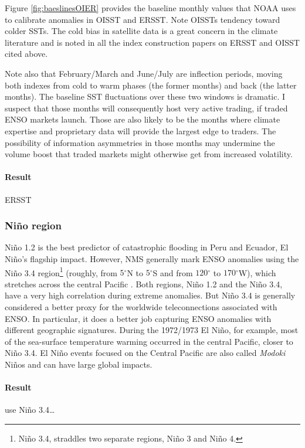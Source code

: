 \documentclass[authoryear]{article}
\newcommand{\degreesym}{\ensuremath{^\circ}}
\begin{document}
Figure \ref{fig:baeslinesOIER} provides the baseline monthly values that NOAA uses to calibrate anomalies in OISST and ERSST. Note OISSTs tendency toward colder SSTs. The cold bias in satellite data is a great concern in the climate literature and is noted in all the index construction papers on ERSST and OISST cited above.

Note also that February/March and June/July are inflection periods, moving both indexes from cold to warm phases (the former months) and back (the latter months). The baseline SST fluctuations over these two windows is dramatic. I suspect that those months will consequently host very active trading, if traded ENSO markets launch. Those are also likely to be the months where climate expertise and proprietary data will provide the largest edge to traders. The possibility of information asymmetries in those months may undermine the volume boost that traded markets might otherwise get from increased volatility. 

\paragraph{Result}
ERSST

\subsubsection{Ni\~no region}
Ni\~no 1.2 is the best predictor of catastrophic flooding in Peru and Ecuador, El Ni\~no's flagship impact. However, NMS generally mark ENSO anomalies using the Ni\~no 3.4 region\footnote{Ni\~no 3.4, straddles two separate regions, Ni\~no 3 and Ni\~no 4.} (roughly, from $5\degreesym$N to $5\degreesym$S and from $120\degreesym$ to $170\degreesym$W), which stretches across the central Pacific\cite{khalil2007Nino} \cite{barnston1997documentation}. Both regions, Ni\~no 1.2 and the Ni\~no 3.4, have a very high correlation during extreme anomalies. But Ni\~no 3.4 is generally considered a better proxy for the worldwide teleconnections associated with ENSO. In particular,  it does a better job capturing ENSO anomalies with different geographic signatures. During the 1972/1973 El Ni\~no, for example, most of the sea-surface temperature warming occurred in the central Pacific, closer to Ni\~no 3.4. El Ni\~no events focused on the Central Pacific are also called \emph{Modoki} Ni\~nos and can have large global impacts\cite{ashok2007Nino}.

\paragraph{Result}
use Ni\~no 3.4…
\end{document}
